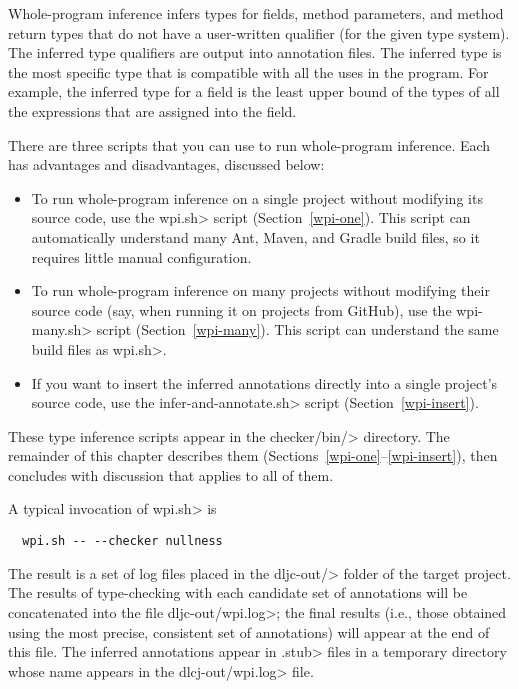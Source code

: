 
Whole-program inference
infers types for fields, method parameters, and method return types that do not
have a user-written qualifier (for the given type system).
The inferred type qualifiers are output into annotation files.
The inferred type is the most specific type that is compatible with all the
uses in the program.  For example, the inferred type for a field is the
least upper bound of the types of all the expressions that are assigned
into the field.

There are three scripts that you can use to run whole-program inference.
Each has advantages and disadvantages, discussed below:

\begin{itemize}
    \item
    To run whole-program inference on a single project without modifying its source code,
    use the \<wpi.sh> script (Section~\ref{wpi-one}). This script can automatically understand
    many Ant, Maven, and Gradle build files, so it requires little manual configuration.

    \item
    To run whole-program inference on many projects without modifying their source code
    (say, when running it on projects from GitHub), use the \<wpi-many.sh> script (Section~\ref{wpi-many}).
    This script can understand the same build files as \<wpi.sh>.

    \item
    If you want to insert the inferred annotations directly into a single
    project's source code, use the \<infer-and-annotate.sh> script (Section~\ref{wpi-insert}).
\end{itemize}

These type inference scripts appear in the \<checker/bin/> directory.
The remainder of this chapter describes them
(Sections~\ref{wpi-one}--\ref{wpi-insert}), then concludes with discussion
that applies to all of them.



A typical invocation of \<wpi.sh> is

\begin{Verbatim}
  wpi.sh -- --checker nullness
\end{Verbatim}

The result is a set of log files placed in the \<dljc-out/> folder of the
target project. The results of type-checking with each candidate set of
annotations will be concatenated into the file \<dljc-out/wpi.log>; the final
results (i.e., those obtained using the most precise, consistent set of annotations)
will appear at the end of this file.
The inferred annotations appear in \<.stub> files in a
temporary directory whose name appears in the \<dlcj-out/wpi.log> file.

